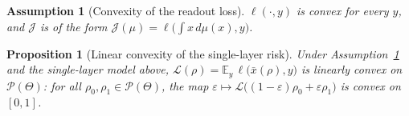\documentclass[11pt,a4wide]{article}
\newtheorem{proposition}[theorem]{Proposition}
\newtheorem{assumption}{Assumption}
\theoremstyle{definition}
\newcommand{\Prob}{\mathcal{P}}
\begin{document}
\begin{assumption}[Convexity of the readout loss]
\label{ass:convex}
$\ell(\cdot,y)$ is convex for every $y$, and $\mathcal J$ is of the form $\mathcal J(\mu) = \ell\big(\textstyle\int x\,d\mu(x),y\big)$.
\end{assumption}
\fi 

\begin{proposition}[Linear convexity of the single-layer risk]
\label{prop:convex}
Under Assumption~\ref{ass:convex} and the single-layer model above, $\mathcal L(\rho) = \mathbb E_y\,\ell\big(\bar x(\rho),y\big)$ is \emph{linearly convex} on $\Prob(\Theta)$: for all $\rho_0,\rho_1\in\Prob(\Theta)$, the map $\varepsilon\mapsto \mathcal L\big((1-\varepsilon)\rho_0+\varepsilon\rho_1\big)$ is convex on $[0,1]$.
\end{proposition}
\end{document}
